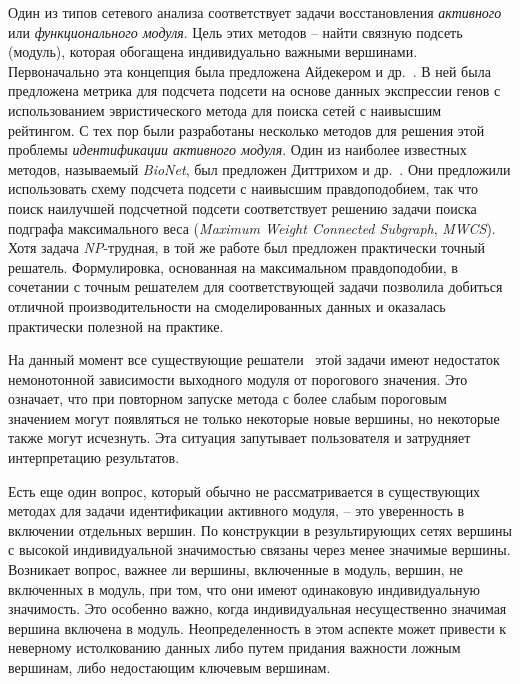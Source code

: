 Один из типов сетевого анализа соответствует задачи восстановления
\emph{активного} или \emph{функционального модуля}. Цель этих методов -- найти
связную подсеть (модуль), которая обогащена индивидуально важными вершинами.
%
Первоначально эта концепция была предложена Айдекером и др.~\cite{Ideker2002}.
В ней была предложена метрика для подсчета подсети на основе данных экспрессии
генов с использованием эвристического метода для поиска сетей с наивысшим
рейтингом. С тех пор были разработаны несколько методов для решения этой
проблемы \emph{идентификации активного модуля}. Один из наиболее известных
методов, называемый \emph{BioNet}, был предложен Диттрихом
и др.~\cite{Dittrich2008a}.  Они предложили использовать схему подсчета подсети
с наивысшим правдоподобием, так что поиск наилучшей подсчетной подсети
соответствует решению задачи поиска подграфа максимального веса (\emph{Maximum
Weight Connected Subgraph}, \emph{MWCS}).  Хотя задача \emph{NP}-трудная, в той
же работе был предложен практически точный решатель.  Формулировка, основанная
на максимальном правдоподобии, в сочетании с точным решателем для
соответствующей задачи позволила добиться отличной производительности на
смоделированных данных и оказалась практически полезной на практике.

На данный момент все существующие
решатели~\cite{Ideker2002,Dittrich2008a,Alcaraz2012,Sergushichev2016} этой
задачи имеют недостаток немонотонной зависимости выходного модуля от порогового
значения.  Это означает, что при повторном запуске метода с более слабым
пороговым значением могут появляться не только некоторые новые вершины, но
некоторые также могут исчезнуть. Эта ситуация запутывает пользователя
и затрудняет интерпретацию результатов.

Есть еще один вопрос, который обычно не рассматривается в существующих методах
для задачи идентификации активного модуля, -- это уверенность в включении
отдельных вершин.  По конструкции в результирующих сетях вершины с высокой
индивидуальной значимостью связаны через менее значимые вершины. Возникает
вопрос, важнее ли вершины, включенные в модуль, вершин, не включенных в модуль, при том, что они имеют одинаковую индивидуальную значимость. Это особенно важно,
когда индивидуальная несущественно значимая вершина включена в модуль.
Неопределенность в этом аспекте может привести к неверному истолкованию данных
либо путем придания важности ложным вершинам, либо недостающим ключевым
вершинам.

